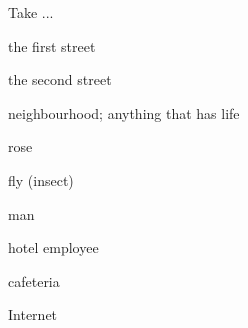 \documentclass[avery5371,grid,frame]{flashcards}
\begin{document}
\begin{flashcard}{\LARGE Take ...}
\LARGE {}
\end{flashcard}
\begin{flashcard}{\LARGE the first street}
\LARGE {}
\end{flashcard}
\begin{flashcard}{\LARGE the second street}
\LARGE {}
\end{flashcard}
\begin{flashcard}{\LARGE neighbourhood; anything that has life}
\LARGE {}
\end{flashcard}
\begin{flashcard}{\LARGE rose}
\LARGE {}
\end{flashcard}
\begin{flashcard}{\LARGE fly (insect)}
\LARGE {}
\end{flashcard}
\begin{flashcard}{\LARGE man}
\LARGE {}
\end{flashcard}
\begin{flashcard}{\LARGE hotel employee}
\LARGE {}
\end{flashcard}
\begin{flashcard}{\LARGE cafeteria}
\LARGE {}
\end{flashcard}
\begin{flashcard}{\LARGE Internet}
\LARGE {}
\end{flashcard}
\end{document}
